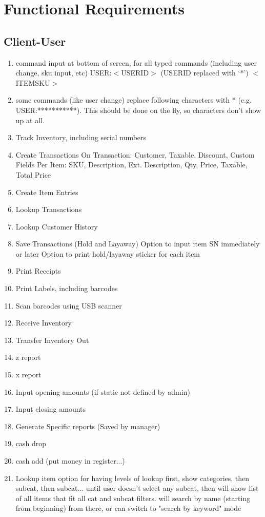 \chapter{Functional Requirements}
\label{01_FuncReqs}

\section{Client-User}
\begin{enumerate}
	\item command input at bottom of screen, for all typed commands (including user change, sku input, etc)
		\subitem USER:$<$USERID$>$ (USERID replaced with `*')
		\subitem $<$ITEMSKU$>$
	\item some commands (like user change) replace following characters with * (e.g. USER:***********). This should be done on the fly, so characters don't show up at all.
	\item Track Inventory, including serial numbers
	\item Create Transactions
		\subitem On Transaction: Customer, Taxable, Discount, Custom Fields
		\subitem Per Item: SKU, Description, Ext. Description, Qty, Price, Taxable, Total Price
	\item Create Item Entries
	\item Lookup Transactions
	\item Lookup Customer History
	\item Save Transactions (Hold and Layaway)
		\subitem Option to input item SN immediately or later
		\subitem Option to print hold/layaway sticker for each item
	\item Print Receipts
	\item Print Labels, including barcodes
	\item Scan barcodes using USB scanner
	\item Receive Inventory
	\item Transfer Inventory Out
	\item z report
	\item x report
	\item Input opening amounts (if static not defined by admin)
	\item Input closing amounts
	\item Generate Specific reports (Saved by manager)
	\item cash drop
	\item cash add (put money in register...)
	\item Lookup item
		\subitem option for having levels of lookup
		\subitem first, show categories, then subcat, then subcat... until user doesn't select any subcat, then will show list of all items that fit all cat and subcat filters. will search by name (starting from beginning) from there, or can switch to "search by keyword" mode
\end{enumerate}


